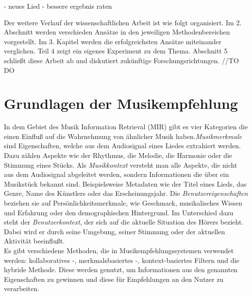 \documentclass[twosided,a4,10pt]{article}
\begin{document}
\begin{multicols}{2}
		- neues Lied
		- bessere ergebnis raten
		
		Der weitere Verlauf der wissenschaftlichen Arbeit ist wie folgt organisiert. Im 2. Abschnitt werden verschieden Ansätze in den jeweiligen Methodenbereichen vorgestellt. Im 3. Kapitel werden die erfolgreichsten Ansätze miteinander verglichen. Teil 4 zeigt ein eigenes Experiment zu dem Thema. Abschnitt 5 schließt diese Arbeit ab und diskutiert zukünftige Forschungsrichtungen. //TO DO
		
		\section{Grundlagen der Musikempfehlung}
		In dem Gebiet des Musik Information Retrieval (MIR) gibt es vier Kategorien \cite{schedl} die einen Einfluß auf die Wahrnehmung von ähnlicher Musik haben.\newline \textit{Musikmerkmale} sind Eigenschaften, welche aus dem Audiosignal eines Liedes extrahiert werden. Dazu zählen Aspekte wie der Rhythmus, die Melodie, die Harmonie oder die Stimmung eines Stücks.\newline
		Als \textit{Musikkontext} versteht man alle Aspekte, die nicht aus dem Audiosignal abgeleitet werden, sondern Informationen die über ein Musikstück bekannt sind. Beispielsweise Metadaten wie der Titel eines Lieds, das Genre, Name des Künstlers oder das Erscheinungsjahr.\newline
		Die \textit{Benutzereigenschaften} beziehen sie auf Persönlichkeitsmerkmale, wie Geschmack, musikalisches Wissen und Erfahrung oder den demographischen Hintergrund.\newline
		Im Unterschied dazu steht der \textit{Benutzerkontext}, der sich auf die aktuelle Situation des Hörers bezieht. Dabei wird er durch seine Umgebung, seiner Stimmung oder der aktuellen Aktivität beeinflußt. \cite{knees}\newline\\
		Es gibt verschiedene Methoden, die in Musikempfehlungssystemen verwendet werden: kollaboratives -, merkmalsbasiertes -, kontext-basiertes Filtern und die hybride Methode. Diese werden genutzt, um Informationen aus den genannten Eigenschaften zu gewinnen und diese für Empfehlungen an den Nutzer zu verarbeiten. \cite{wang}
	

\end{multicols}
\end{document}
